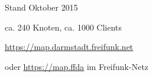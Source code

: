 \documentclass[10pt]{beamer}
\begin{document}
\begin{frame}{Stand Oktober 2015}
	\begin{center}
		\vfill
		ca. 240 Knoten, ca. 1000 Clients
		\begin{center}
		\end{center}
		
		\vfill
		\url{https://map.darmstadt.freifunk.net}
		
		\tiny oder \url{https://map.ffda} im Freifunk-Netz
	\end{center}	
\end{frame}
\end{document}
